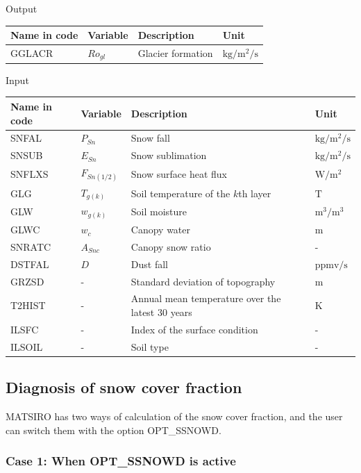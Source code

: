 Output

\begin{longtable}[]{@{}llll@{}}
\toprule
Name in code & Variable & Description & Unit \\
\midrule
\endhead
GGLACR & \(Ro_{gl}\) & Glacier formation & \(\mathrm{kg/m^2/s}\) \\
\bottomrule
\end{longtable}

Input

\begin{longtable}[]{@{}llll@{}}
\toprule
Name in code & Variable & Description & Unit \\
\midrule
\endhead
SNFAL & \(P_{Sn}\) & Snow fall & \(\mathrm{kg/m^2/s}\) \\
SNSUB & \(E_{Sn}\) & Snow sublimation & \(\mathrm{kg/m^2/s}\) \\
SNFLXS & \(F_{Sn(1/2)}\) & Snow surface heat flux & \(\mathrm{W/m^2}\) \\
GLG & \(T_{g(k)}\) & Soil temperature of the \(k\)th layer & \(\mathrm{T}\) \\
GLW & \(w_{g(k)}\) & Soil moisture & \(\mathrm{m^3/m^3}\) \\
GLWC & \(w_c\) & Canopy water & \(\mathrm{m}\) \\
SNRATC & \(A_{Snc}\) & Canopy snow ratio & - \\
DSTFAL & \(D\) & Dust fall & \(\mathrm{ppmv/s}\) \\
GRZSD & - & Standard deviation of topography & \(\mathrm{m}\) \\
T2HIST & - & Annual mean temperature over the latest 30 years & \(\mathrm{K}\) \\
ILSFC & - & Index of the surface condition & - \\
ILSOIL & - & Soil type & - \\
\bottomrule
\end{longtable}

\hypertarget{diagnosis-of-snow-cover-fraction}{%
\subsection{Diagnosis of snow cover fraction}\label{diagnosis-of-snow-cover-fraction}}

MATSIRO has two ways of calculation of the snow cover fraction, and the user can switch them with the option OPT\_SSNOWD.

\hypertarget{case-1-when-opt_ssnowd-is-active}{%
\subsubsection{Case 1: When OPT\_SSNOWD is active}\label{case-1-when-opt_ssnowd-is-active}}

